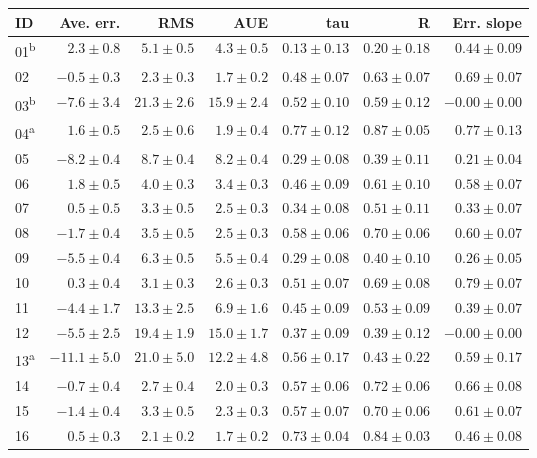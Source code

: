 \footnotesize
\begin{tabular}{l r r r r r r}
\hline
ID & Ave. err. & RMS & AUE & tau & R & Err. slope \\ 
\hline
01\textsuperscript{b} & $2.3 \pm 0.8$ & $5.1 \pm 0.5$ & $4.3 \pm 0.5$ & $0.13 \pm 0.13$ & $0.20 \pm 0.18$ & $0.44 \pm 0.09$ \\ 
02 & $-0.5 \pm 0.3$ & $2.3 \pm 0.3$ & $1.7 \pm 0.2$ & $0.48 \pm 0.07$ & $0.63 \pm 0.07$ & $0.69 \pm 0.07$ \\ 
03\textsuperscript{b} & $-7.6 \pm 3.4$ & $21.3 \pm 2.6$ & $15.9 \pm 2.4$ & $0.52 \pm 0.10$ & $0.59 \pm 0.12$ & $-0.00 \pm 0.00$ \\ 
04\textsuperscript{a} & $1.6 \pm 0.5$ & $2.5 \pm 0.6$ & $1.9 \pm 0.4$ & $0.77 \pm 0.12$ & $0.87 \pm 0.05$ & $0.77 \pm 0.13$ \\ 
05 & $-8.2 \pm 0.4$ & $8.7 \pm 0.4$ & $8.2 \pm 0.4$ & $0.29 \pm 0.08$ & $0.39 \pm 0.11$ & $0.21 \pm 0.04$ \\ 
06 & $1.8 \pm 0.5$ & $4.0 \pm 0.3$ & $3.4 \pm 0.3$ & $0.46 \pm 0.09$ & $0.61 \pm 0.10$ & $0.58 \pm 0.07$ \\ 
07 & $0.5 \pm 0.5$ & $3.3 \pm 0.5$ & $2.5 \pm 0.3$ & $0.34 \pm 0.08$ & $0.51 \pm 0.11$ & $0.33 \pm 0.07$ \\ 
08 & $-1.7 \pm 0.4$ & $3.5 \pm 0.5$ & $2.5 \pm 0.3$ & $0.58 \pm 0.06$ & $0.70 \pm 0.06$ & $0.60 \pm 0.07$ \\ 
09 & $-5.5 \pm 0.4$ & $6.3 \pm 0.5$ & $5.5 \pm 0.4$ & $0.29 \pm 0.08$ & $0.40 \pm 0.10$ & $0.26 \pm 0.05$ \\ 
10 & $0.3 \pm 0.4$ & $3.1 \pm 0.3$ & $2.6 \pm 0.3$ & $0.51 \pm 0.07$ & $0.69 \pm 0.08$ & $0.79 \pm 0.07$ \\ 
11 & $-4.4 \pm 1.7$ & $13.3 \pm 2.5$ & $6.9 \pm 1.6$ & $0.45 \pm 0.09$ & $0.53 \pm 0.09$ & $0.39 \pm 0.07$ \\ 
12 & $-5.5 \pm 2.5$ & $19.4 \pm 1.9$ & $15.0 \pm 1.7$ & $0.37 \pm 0.09$ & $0.39 \pm 0.12$ & $-0.00 \pm 0.00$ \\ 
13\textsuperscript{a} & $-11.1 \pm 5.0$ & $21.0 \pm 5.0$ & $12.2 \pm 4.8$ & $0.56 \pm 0.17$ & $0.43 \pm 0.22$ & $0.59 \pm 0.17$ \\ 
14 & $-0.7 \pm 0.4$ & $2.7 \pm 0.4$ & $2.0 \pm 0.3$ & $0.57 \pm 0.06$ & $0.72 \pm 0.06$ & $0.66 \pm 0.08$ \\ 
15 & $-1.4 \pm 0.4$ & $3.3 \pm 0.5$ & $2.3 \pm 0.3$ & $0.57 \pm 0.07$ & $0.70 \pm 0.06$ & $0.61 \pm 0.07$ \\ 
16 & $0.5 \pm 0.3$ & $2.1 \pm 0.2$ & $1.7 \pm 0.2$ & $0.73 \pm 0.04$ & $0.84 \pm 0.03$ & $0.46 \pm 0.08$ \\ 

\end{tabular}
